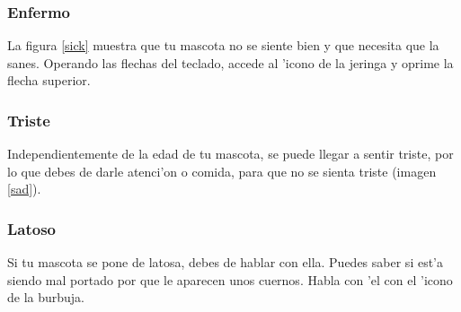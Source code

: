 \documentclass[12pt]{amsart}
\begin{document}
\subsubsection{Enfermo}
La figura \ref{sick} muestra que tu mascota no se siente bien y que necesita que la sanes. Operando las flechas del teclado, accede al 'icono de la jeringa y oprime la flecha superior.

\subsubsection{Triste}
Independientemente de la edad de tu mascota, se puede llegar a sentir triste, por lo que debes de darle atenci'on o comida, para que no se sienta triste (imagen \ref{sad}).

\subsubsection{Latoso}
Si tu mascota se pone de latosa, debes de hablar con ella. Puedes saber si est'a siendo mal portado por que le aparecen unos cuernos. Habla con 'el con el 'icono de la burbuja.
\end{document}
